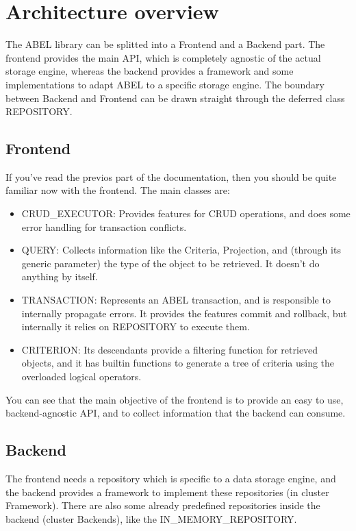\section{Architecture overview}

The ABEL library can be splitted into a Frontend and a Backend part.
The frontend provides the main API, which is completely agnostic of the actual storage engine, 
whereas the backend provides a framework and some implementations to adapt ABEL to a specific storage engine.
The boundary between Backend and Frontend can be drawn straight through the deferred class REPOSITORY.

\subsection{Frontend}

If you've read the previos part of the documentation, then you should be quite familiar now with the frontend.
The main classes are:
 \begin{itemize}
  \item CRUD\_EXECUTOR: Provides features for CRUD operations, and does some error handling for transaction conflicts.
  \item QUERY: Collects information like the Criteria, Projection, and (through its generic parameter) the type of the object to be retrieved. It doesn't do anything by itself.
  \item TRANSACTION: Represents an ABEL transaction, and is responsible to internally propagate errors. It provides the features commit and rollback, but internally it relies on REPOSITORY to execute them.
  \item CRITERION: Its descendants provide a filtering function for retrieved objects, and it has builtin functions to generate a tree of criteria using the overloaded logical operators.
 \end{itemize}

You can see that the main objective of the frontend is to provide an easy to use, backend-agnostic API, and to collect information that the backend can consume.



\subsection{Backend}

The frontend needs a repository which is specific to a data storage engine, and the backend provides a framework to implement these repositories (in cluster Framework).
There are also some already predefined repositories inside the backend (cluster Backends), like the IN_MEMORY_REPOSITORY.

